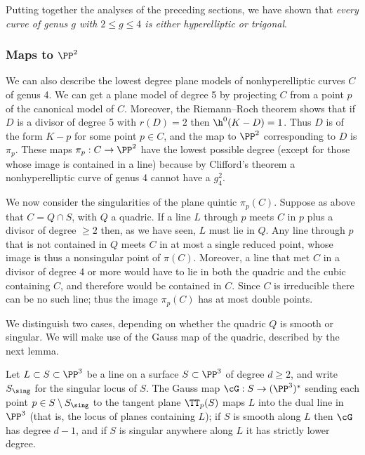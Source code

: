 Putting together
the analyses of the preceding sections, we have shown that
%
\emph{every curve of genus $g$ with $2\leq g \leq 4$ is either hyperelliptic or trigonal}.

\subsubsection*{Maps to $\PP^2$}

We can also describe the lowest degree plane models of nonhyperelliptic curves $C$ of genus 4.
We can get a plane model of degree 5 by projecting $C$ from a point $p$ of the canonical model of $C$.
Moreover, the
Riemann--Roch theorem
%
shows that if $D$ is a divisor of
degree 5 with $r(D)=2$ then
$\h^0(K-D) = 1$. Thus $D$ is of the form
$K-p$ for some point $p \in C$, and the map to $\PP^2$ corresponding
to $D$ is $\pi_p$. These  maps $\pi_p: C\to \PP^2$ have the lowest
possible degree (except for those whose image is  contained in a line)
because by
Clifford's theorem
%
a nonhyperelliptic curve of genus 4
cannot have a $g^2_4$.

We now consider the singularities of the
plane quintic
%
$\pi_p(C)$.
Suppose as above that $C = Q\cap S$, with $Q$ a quadric. If a line $L$
through $p$ meets $C$ in $p$ plus a divisor of degree $\geq 2$ then,
as we have seen, $L$ must lie in $Q$.  Any line through $p$ that is
not contained in $Q$ meets $C$ in at most a single reduced point,
whose image is thus a nonsingular point of $\pi(C)$. Moreover, a line
that met $C$ in a divisor of degree 4 or more
would have to lie in both the quadric and
the cubic containing $C$, and therefore would be contained in $C$.
Since $C$ is irreducible there can be no such line; thus the image
$\pi_p(C)$ has at most double points.

We distinguish two cases, depending on whether
the quadric $Q$ is smooth or singular. We will make use of the
Gauss map
%
of the quadric,
described by the next lemma.

\begin{lemma}
Let $L \subset S \subset \PP^3$ be a line on a surface $S \subset \PP^3$ of degree $d \geq 2$, and
write $S_{\sing}$ for the singular locus of $S$. The Gauss map $\cG :
S \to (\PP^3)^*$ sending each point $p \in S\setminus S_{\sing}$ to
the tangent plane $\TT_p(S)$ maps $L$ into the
dual line
%
in $\PP^3$ (that is, the locus of planes containing $L$); if $S$ is
smooth along $L$ then $\cG$  has degree $d-1$, and if $S$ is singular
anywhere along $L$ it has strictly lower degree.
\unif
\end{lemma}

